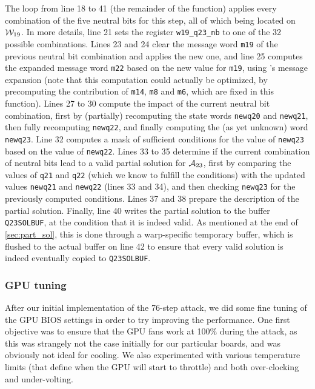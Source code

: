 The loop from line 18 to 41 (\ie the remainder of the function) applies every combination of the five neutral bits for this step, all of which being located on $\mathcal{W}_{19}$. In more details, line 21 sets the register
\texttt{w19_q23_nb} to one of the 32 possible combinations. Lines 23 and 24 clear the message word \texttt{m19} of the previous neutral bit combination and applies the new one, and line 25
computes the expanded message word \texttt{m22} based on the new value for \texttt{m19}, using \shaone's message expansion (note that this computation could actually be optimized, \eg by
precomputing the contribution of \texttt{m14}, \texttt{m8} and \texttt{m6}, which are fixed in this function).
Lines 27 to 30 compute the impact of the current neutral bit combination, first by (partially) recomputing the state words \texttt{newq20} and \texttt{newq21}, then fully recomputing
\texttt{newq22}, and finally computing the (as yet unknown) word \texttt{newq23}.
Line 32 computes a mask of sufficient conditions for the value of \texttt{newq23} based on the value of \texttt{newq22}.
Lines 33 to 35 determine if the current combination of neutral bits lead to a valid partial solution for $\mathcal{A}_{23}$, first by comparing the values of \texttt{q21} and  \texttt{q22}
(which we know to fulfill the conditions) with the updated values \texttt{newq21} and \texttt{newq22} (lines 33 and 34), and then checking \texttt{newq23} for the previously computed conditions.
Lines 37 and 38 prepare the description of the partial solution.
Finally, line 40 writes the partial solution to the buffer \texttt{Q23SOLBUF}, at the condition that it is indeed valid. As mentioned at the end of \autoref{sec:part_sol}, this is done through a warp-specific
temporary buffer, which is flushed to the actual buffer on line 42 to ensure that every valid solution is indeed eventually copied to \texttt{Q23SOLBUF}.



\subsubsection{GPU tuning}
\label{sec:gpu_tune}

After our initial implementation of the 76-step attack, we did some fine tuning of the GPU BIOS settings in order to try improving the performance.
One first objective was to ensure that the GPU fans work at 100\% during the attack, as this was strangely
not the case initially for our particular boards, and was obviously not ideal for cooling.
We also experimented with various temperature limits
(that define when the GPU will start to throttle) and both over-clocking and under-volting.

